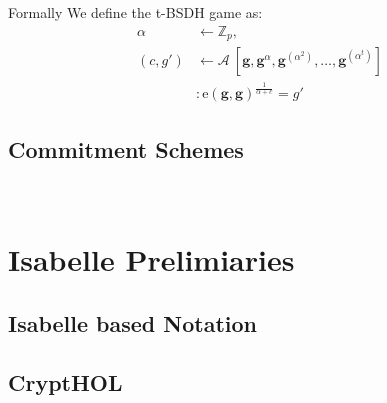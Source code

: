 Formally We define the t-BSDH game as:
\begin{equation*}
    \begin{split}
        \alpha & \leftarrow \mathbb{Z}_p,\\
        (c, g') & \leftarrow  \mathcal{A}\ [\textbf{g}, \textbf{g}^\alpha, \textbf{g}^{(\alpha^2)}, \dots, \textbf{g}^{(\alpha^t)}]\\
        & : \text{e}(\textbf{g}, \textbf{g})^{\frac{1}{\alpha+c}} = g'
    \end{split}
\end{equation*}

\subsection{Commitment Schemes}
~\parencite{thalerbook}

\section{Isabelle Prelimiaries}

\subsection{Isabelle based Notation}

\subsection{CryptHOL}